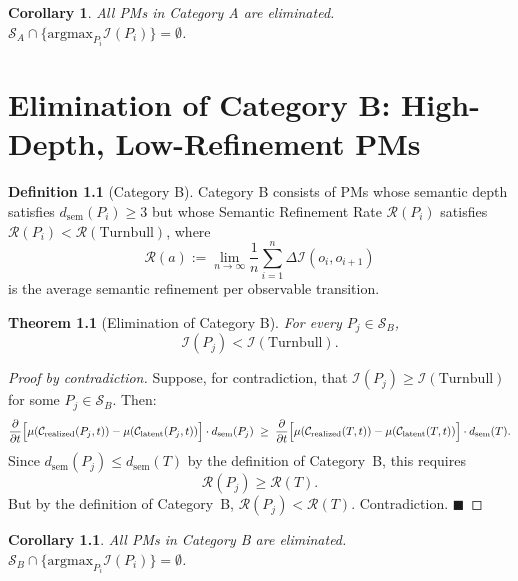 \documentclass[12pt,anyside]{book}
\theoremstyle{plain}
\newtheorem{theorem}{Theorem}[chapter]
\newtheorem{corollary}{Corollary}[theorem]
\theoremstyle{definition}
\newtheorem{definition}{Definition}[chapter]
\newcommand{\Ical}{\mathcal{I}}        %
\newcommand{\Scal}{\mathcal{S}}        %
\begin{document}
\begin{corollary}\label{cor:elimA}
All PMs in Category A are eliminated. $\Scal_A \cap \{\text{argmax}_{P_i} \Ical(P_i)\} = \emptyset$.
\end{corollary}

\chapter{Elimination of Category B: High-Depth, Low-Refinement PMs}

\begin{definition}[Category B]\label{def:catB}
Category B consists of PMs whose semantic depth satisfies $d_{\mathrm{sem}}(P_i) \geq 3$ but whose Semantic Refinement Rate $\mathcal{R}(P_i)$ satisfies $\mathcal{R}(P_i) < \mathcal{R}(\text{Turnbull})$, where
\[
\mathcal{R}(a) := \lim_{n \to \infty} \frac{1}{n} \sum_{i=1}^{n} \Delta\Ical(o_i, o_{i+1})
\]
is the average semantic refinement per observable transition.
\end{definition}

\begin{theorem}[Elimination of Category B]\label{thm:elimB}
For every $P_j \in \Scal_B$,
\[
\Ical(P_j) < \Ical(\text{Turnbull}).
\]
\end{theorem}

\begin{proof}[Proof by contradiction]
Suppose, for contradiction, that $\Ical(P_j) \geq \Ical(\text{Turnbull})$ for some $P_j \in \Scal_B$. Then:
\[
\frac{\partial}{\partial t}
\Bigl[
\mu(\mathcal{C}_{\mathrm{realized}}(P_j,t))
- \mu(\mathcal{C}_{\mathrm{latent}}(P_j,t))
\Bigr]
\cdot d_{\mathrm{sem}}(P_j)
\;\geq\;
\frac{\partial}{\partial t}
\Bigl[
\mu(\mathcal{C}_{\mathrm{realized}}(T,t))
- \mu(\mathcal{C}_{\mathrm{latent}}(T,t))
\Bigr]
\cdot d_{\mathrm{sem}}(T).
\]
Since $d_{\mathrm{sem}}(P_j) \leq d_{\mathrm{sem}}(T)$ by the definition of Category~B, this requires
\[
\mathcal{R}(P_j) \geq \mathcal{R}(T).
\]
But by the definition of Category~B, $\mathcal{R}(P_j) < \mathcal{R}(T)$. Contradiction. $\blacksquare$
\end{proof}

\begin{corollary}\label{cor:elimB}
All PMs in Category B are eliminated. $\Scal_B \cap \{\text{argmax}_{P_i} \Ical(P_i)\} = \emptyset$.
\end{corollary}
\end{document}
